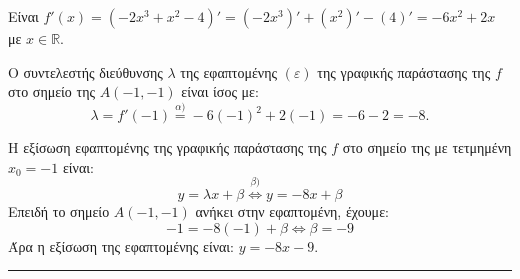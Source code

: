 \begin{alist}
\item Είναι $f'(x)=\left(-2x^3+x^2-4\right)'=\left(-2x^3\right)'+\left(x^2\right)'-(4)'=-6x^2+2x$ με $x \in \mathbb{R}$.

\item Ο συντελεστής διεύθυνσης $\lambda$ της εφαπτομένης $(\varepsilon)$ της γραφικής παράστασης της $f$ στο σημείο της $A(-1,-1)$ είναι ίσος με:
\[ \lambda=f'(-1)\overset{\alpha)}{=}-6(-1)^2+2(-1)=-6-2=-8 . \]

\item Η εξίσωση εφαπτομένης της γραφικής παράστασης της $f$ στο σημείο της με τετμημένη $x_0=-1$ είναι:
\[ y=\lambda x+\beta \overset{\beta)}{\iff} y=-8x+\beta \]
Επειδή το σημείο $A(-1,-1)$ ανήκει στην εφαπτομένη, έχουμε:
\[ -1=-8(-1)+\beta \iff \beta=-9 \]
Άρα η εξίσωση της εφαπτομένης είναι: $y=-8x-9$.
\end{alist}
\vspace{6mm}
\noindent\rule{\textwidth}{0.4pt}
\vspace{6mm}

